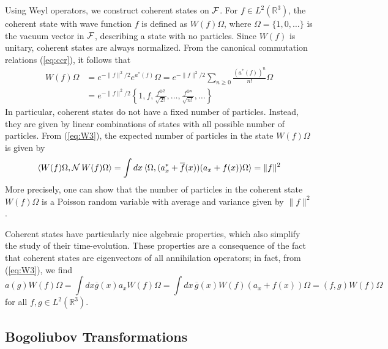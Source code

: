 \documentclass[11pt,a4paper,DIV11]{scrartcl}	%
\newcommand{\bR}{{\mathbb R}}
\newcommand{\cF}{{\cal F}}
\newcommand{\cN}{{\cal N}}
\begin{document}
Using Weyl operators, we construct coherent states on $\cF$. For $f \in L^2 (\bR^3)$, the coherent state with wave function $f$ is defined as $W(f) \Omega$, where $\Omega = \{ 1, 0, \dots \}$ is the vacuum vector in $\cF$, describing a state with no particles. Since $W(f)$ is unitary, coherent states are always normalized. {F}rom the canonical commutation relations (\ref{eq:ccr}), it follows that  
\[ \begin{split} 
W(f) \Omega &= e^{-\| f \|^2 /2} e^{a^* (f)} \Omega = e^{-\| f\|^2/2} \sum_{n \geq 0} \frac{(a^* (f))^n}{n!} \Omega \\ &= e^{-\| f\|^2/2} \left\{ 1 , f , \frac{f^{\otimes 2}}{\sqrt{2!}} , \dots , \frac{f^{\otimes n}}{\sqrt{n!}} , \dots \right\} \end{split} \]
In particular, coherent states do not have a fixed number of particles. Instead, they are given by linear combinations of states with all possible number of particles. {F}rom (\ref{eq:W3}), the expected 
number of particles in the state $W(f) \Omega$ is given by
\[ \langle W(f) \Omega, \cN \, W(f) \Omega \rangle = \int dx \, \langle \Omega, (a_x^* + \overline{f} (x)) (a_x + f(x)) \Omega \rangle = \| f \|^2 \]
More precisely, one can show that the number of particles in the coherent state $W(f) \Omega$ is a Poisson random variable with average and variance given by $\| f \|^2$. 

\medskip

Coherent states have particularly nice algebraic properties, which also simplify the study of their time-evolution. These properties are a consequence of the fact that coherent states are eigenvectors of all annihilation operators; in fact, from (\ref{eq:W3}), we find 
\[  a(g) W(f) \Omega = \int dx \overline{g} (x) a_x W(f) \Omega = \int dx \, \overline{g}(x) W(f) (a_x + f(x)) \Omega = (f,g) W(f) \Omega \]
for all $f,g \in L^2 (\bR^3)$.


\subsection{Bogoliubov Transformations}
\label{sec:bt}
\end{document}
